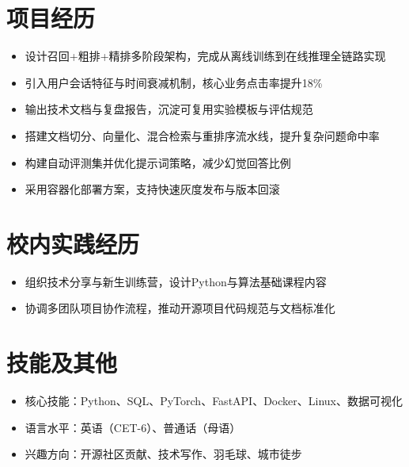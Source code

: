 \section{项目经历}

\begin{itemize}
  \item 设计召回+粗排+精排多阶段架构，完成从离线训练到在线推理全链路实现
  \item 引入用户会话特征与时间衰减机制，核心业务点击率提升18\%
  \item 输出技术文档与复盘报告，沉淀可复用实验模板与评估规范
\end{itemize}


\begin{itemize}
  \item 搭建文档切分、向量化、混合检索与重排序流水线，提升复杂问题命中率
  \item 构建自动评测集并优化提示词策略，减少幻觉回答比例
  \item 采用容器化部署方案，支持快速灰度发布与版本回滚
\end{itemize}


\section{校内实践经历}

\begin{itemize}
  \item 组织技术分享与新生训练营，设计Python与算法基础课程内容
  \item 协调多团队项目协作流程，推动开源项目代码规范与文档标准化
\end{itemize}


\section{技能及其他}
\begin{itemize}
  \item 核心技能：Python、SQL、PyTorch、FastAPI、Docker、Linux、数据可视化
  \item 语言水平：英语（CET-6）、普通话（母语）
  \item 兴趣方向：开源社区贡献、技术写作、羽毛球、城市徒步
\end{itemize}





